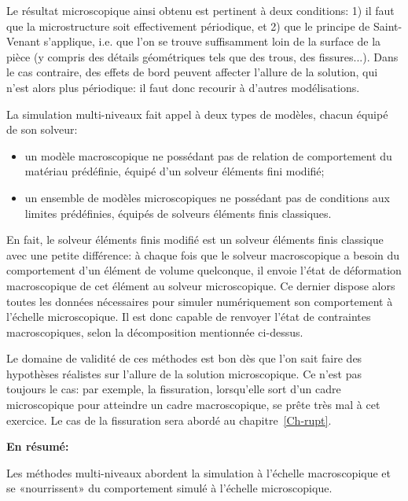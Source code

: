 Le résultat microscopique ainsi obtenu est pertinent à deux conditions: 1) il faut que la microstructure soit effectivement périodique, et 2) que le principe de Saint-Venant s'applique, i.e. que l'on se trouve suffisamment loin de la surface de la pièce (y compris des détails géométriques tels que des trous, des fissures...). Dans le cas contraire, des effets de bord peuvent affecter l'allure de la solution, qui n'est alors plus périodique: il faut donc recourir à d'autres modélisations.

\medskip
La simulation multi-niveaux fait appel à deux types de modèles, chacun équipé de son solveur:
\begin{itemize}
  \item un modèle macroscopique ne possédant pas de relation de comportement du matériau prédéfinie, équipé d'un solveur éléments fini modifié;
  \item un ensemble de modèles microscopiques ne possédant pas de conditions aux limites prédéfinies, équipés de solveurs éléments finis classiques.
\end{itemize}

En fait, le solveur éléments finis modifié est un solveur éléments finis classique avec une petite différence: à chaque fois que le solveur macroscopique a besoin du comportement d'un élément de volume quelconque, il envoie l'état de déformation macroscopique de cet élément au solveur microscopique. Ce dernier dispose alors toutes les données nécessaires pour simuler  numériquement son comportement à l'échelle microscopique. Il est donc capable de renvoyer l'état de contraintes macroscopiques, selon la décomposition mentionnée ci-dessus.

Le domaine de validité de ces méthodes est bon dès que l'on sait faire des hypothèses réalistes sur l'allure de la solution microscopique. Ce n'est pas toujours le cas: par exemple, la fissuration, lorsqu'elle sort d'un cadre microscopique pour atteindre un cadre macroscopique, se prête très mal à cet exercice.
Le cas de la fissuration sera abordé au chapitre~\ref{Ch-rupt}.

\medskip{}
\textbf{En résumé:}

Les méthodes multi-niveaux abordent la simulation à l'échelle macroscopique et se «nourrissent» du comportement simulé à l'échelle microscopique.

